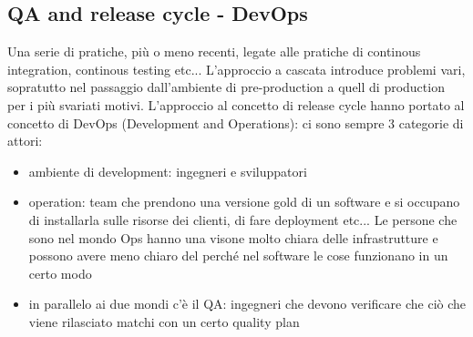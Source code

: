 \documentclass{article}
\begin{document}
\subsection{QA and release cycle - DevOps}
Una serie di pratiche, più o meno recenti, legate alle pratiche di continous integration, continous testing etc... L'approccio a cascata introduce problemi vari, sopratutto nel passaggio dall'ambiente di pre-production a quell di production per i più svariati motivi. L'approccio al concetto di release cycle hanno portato al concetto di DevOps (Development and Operations): ci sono sempre 3 categorie di attori:
\begin{itemize}
\item ambiente di development: ingegneri e sviluppatori
\item operation: team che prendono una versione gold di un software e si occupano di installarla sulle risorse dei clienti, di fare deployment etc... Le persone che sono nel mondo Ops hanno una visone molto chiara delle infrastrutture e possono avere meno chiaro del perché nel software le cose funzionano in un certo modo
\item in parallelo ai due mondi c'è il QA: ingegneri che devono verificare che ciò che viene rilasciato matchi con un certo quality plan
\end{itemize}
\end{document}
